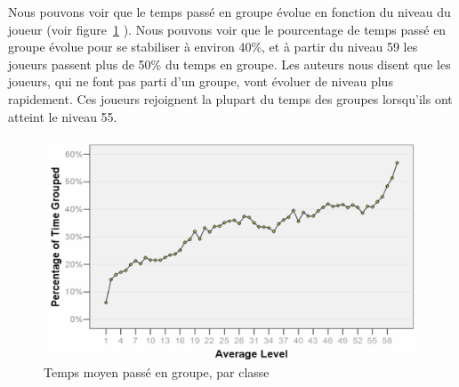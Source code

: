 \documentclass[11pt,a4paper]{article}
\begin{document}
\par Nous pouvons voir que le temps passé en groupe évolue en fonction du niveau du joueur (voir figure~\ref{timespentgroup} ). Nous pouvons voir que le pourcentage de temps passé en groupe évolue pour se stabiliser à environ 40\%, et à partir du niveau 59 les joueurs passent plus de 50\% du temps en groupe. Les auteurs nous disent que les joueurs, qui ne font pas parti d'un groupe, vont évoluer de niveau plus rapidement. Ces joueurs rejoignent la plupart du temps des groupes lorsqu'ils ont atteint le niveau 55. 
	\begin{figure}[!h]
        \centering
        \includegraphics[scale=0.95]{./images/timespentgroup.png}
        \caption{Temps moyen passé en groupe, par classe}
        \label{timespentgroup}
        \end{figure}
\end{document}
